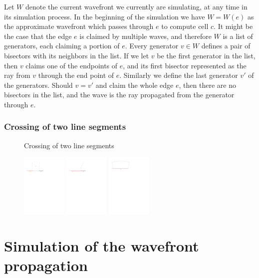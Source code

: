 Let $W$ denote the current wavefront we currently are simulating, at any time in its simulation process. In the 
beginning of the simulation we have $W = W(e)$ as the approximate wavefront which passes through $e$ to compute cell
$c$. It might be the case that the edge $e$ is claimed by multiple waves, and therefore $W$ is a list of generators,
each claiming a portion of $e$. Every generator $v \in W$ defines a pair of bisectors with its neighbors in the 
list. If we let $v$ be the first generator in the list, then $v$ claims one of the endpoints of $e$, and its first 
bisector represented as the ray from $v$ through the end point of $e$. Similarly we define the last generator $v'$ 
of the generators. Should $v = v'$ and claim the whole edge $e$, then there are no bisectors in the list, and the 
wave is the ray propagated from the generator through $e$. 

\subsubsection{Crossing of two line segments}
\begin{figure}[H]
	\caption{Crossing of two line segments}
		\includegraphics[height=3cm]{figures/vandvprimesharingedge.pdf}
		\caption{}
		\label{fig:crosses_a}
	\endminipage\hfill
		\includegraphics[height=3cm]{figures/vandvprimeallofe.pdf}
		\caption{}
		\label{fig:crosses_b}
	\endminipage\hfill
		\includegraphics[height=3cm]{figures/visallofe.pdf}
		\caption{}
		\label{fig:crosses_c}
		\endminipage\hfill
\end{figure}

\section{Simulation of the wavefront propagation}



